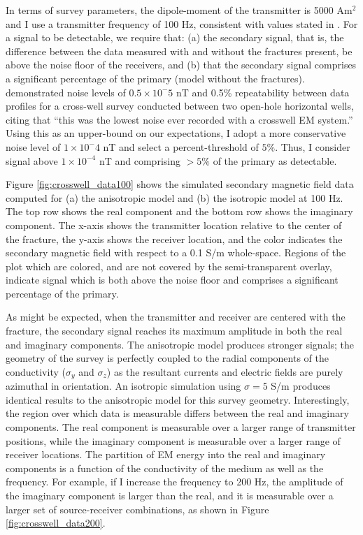 In terms of survey parameters, the dipole-moment of the transmitter is 5000 Am$^2$ and I use a transmitter frequency of 100 Hz, consistent with values stated in \cite{Wilt1995, Wilt2003}. For a signal to be detectable, we require that: (a) the secondary signal, that is, the difference between the data measured with and without the fractures present, be above the noise floor of the receivers, and (b) that the secondary signal comprises a significant percentage of the primary (model without the fractures). \cite{Marsala2015a} demonstrated noise levels of $0.5 \times 10^-5$ nT and 0.5\% repeatability between data profiles for a cross-well survey conducted between two open-hole horizontal wells, citing that ``this was the lowest noise ever recorded with a crosswell EM system.'' Using this as an upper-bound on our expectations, I adopt a more conservative noise level of $1\times10^-4$ nT and select a percent-threshold of $5\%$. Thus, I consider signal above $1\times10^{-4}$ nT and comprising $>5\%$ of the primary as detectable.

Figure \ref{fig:crosswell_data100} shows the simulated secondary magnetic field data computed for (a) the anisotropic model and (b) the isotropic model at 100 Hz. The top row shows the real component and the bottom row shows the imaginary component. The x-axis shows the transmitter location relative to the center of the fracture, the y-axis shows the receiver location, and the color indicates the secondary magnetic field with respect to a 0.1 S/m whole-space. Regions of the plot which are colored, and are not covered by the semi-transparent overlay, indicate signal which is both above the noise floor and comprises a significant percentage of the primary.




As might be expected, when the transmitter and receiver are centered with the fracture, the secondary signal reaches its maximum amplitude in both the real and imaginary components. The anisotropic model produces stronger signals; the geometry of the survey is perfectly coupled to the radial components of the conductivity ($\sigma_y$ and $\sigma_z$) as the resultant currents and electric fields are purely azimuthal in orientation. An isotropic simulation using $\sigma = 5$ S/m produces identical results to the anisotropic model for this survey geometry. Interestingly, the region over which data is measurable differs between the real and imaginary components. The real component is measurable over a larger range of transmitter positions, while the imaginary component is measurable over a larger range of receiver locations. The partition of EM energy into the real and imaginary components is a function of the conductivity of the medium as well as the frequency. For example, if I increase the frequency to 200 Hz, the amplitude of the imaginary component is larger than the real, and it is measurable over a larger set of source-receiver combinations, as shown in Figure \ref{fig:crosswell_data200}.

